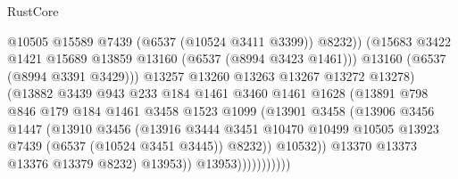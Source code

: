 \begin{lexlean}{RustCore}
\begin{coremodule}
                                    @10505
                                    @15589
                                    @7439
                                    (@6537 (@10524 @3411 @3399))
                                    @8232))
                                (@15683
                                  @3422
                                  @1421
                                  @15689
                                  @13859
                                  @13160
                                  (@6537 (@8994 @3423 @1461)))
                                @13160
                                (@6537 (@8994 @3391 @3429)))
                              @13257
                              @13260
                              @13263
                              @13267
                              @13272
                              @13278)
                            (@13882
                              @3439
                              @943
                              @233
                              @184
                              @1461
                              @3460
                              @1461
                              @1628
                              (@13891
                                @798
                                @846
                                @179
                                @184
                                @1461
                                @3458
                                @1523
                                @1099
                                (@13901
                                  @3458
                                  (@13906
                                    @3456
                                    @1447
                                    (@13910
                                      @3456
                                      (@13916
                                        @3444
                                        @3451
                                        @10470
                                        @10499
                                        @10505
                                        @13923
                                        @7439
                                        (@6537 (@10524 @3451 @3445))
                                        @8232))
                                    @10532))
                                @13370
                                @13373
                                @13376
                                @13379
                                @8232)
                              @13953))
                          @13953)))))))))))

\end{coremodule}
\end{lexlean}
